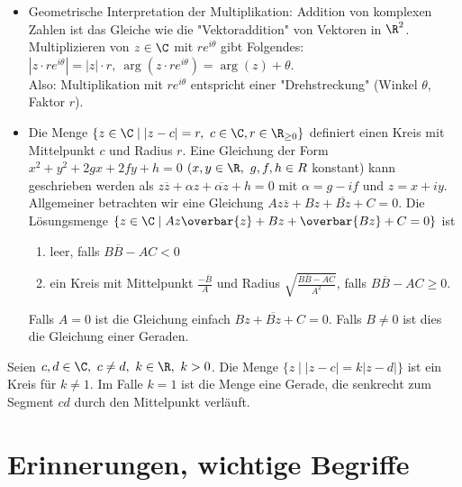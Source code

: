\begin{itemize}
	\item Geometrische Interpretation der Multiplikation: Addition von komplexen Zahlen ist das Gleiche wie die "Vektoraddition" von Vektoren in $\R^2$. Multiplizieren von $ z \in \C $ mit $ re^{i\theta} $ gibt Folgendes: $ |z \cdot re^{i\theta}| = |z| \cdot r,\ \arg(z \cdot re^{i\theta}) = \arg(z) + \theta $.\\
	Also: Multiplikation mit $ re^{i\theta} $ entspricht einer "Drehstreckung" (Winkel $\theta$, Faktor $r$).
	
	\item Die Menge $ \{z \in \C \mid |z-c| = r,\ c \in \C, r \in \R_{\geq 0}\} $ definiert einen Kreis mit Mittelpunkt $c$ und Radius $r$. Eine Gleichung der Form $ x^2 + y^2 + 2gx + 2fy + h = 0 $ $ (x,y \in \R,\ g,f,h \in R $ konstant) kann geschrieben werden als $ z \overbar{z} + \alpha z + \overbar{\alpha z} + h=0 $ mit $ \alpha = g-if $ und $ z = x+iy $. Allgemeiner betrachten wir eine Gleichung $ Az\overbar{z} + Bz + \overbar{Bz} + C = 0. $ Die Lösungsmenge $ \{ z \in \C \mid Az\overbar{z} + Bz + \overbar{Bz} + C = 0 \} $ ist
	\begin{enumerate}[label={\roman*})]
		\item leer, falls $ B\overbar{B} - AC < 0 $
		\item ein Kreis mit Mittelpunkt $ \frac{-\overbar{B}}{A} $ und Radius $ \sqrt{\frac{B \overbar{B} - AC}{A^2}} $, falls $ B\overbar{B} - AC \geq 0 $.
	\end{enumerate}
	Falls $A=0$ ist die Gleichung einfach $ Bz + \overbar{Bz} + C = 0 $. Falls $ B \neq 0 $ ist dies die Gleichung einer Geraden.
\end{itemize}

\begin{thm}
	Seien $ c,d \in \C,\ c \neq d,\ k \in \R,\ k > 0 $. Die Menge $ \{ z \mid |z-c| = k|z-d| \} $ ist ein Kreis für $ k \neq 1 $. Im Falle $ k = 1 $ ist die Menge eine Gerade, die senkrecht zum Segment $ cd $ durch den Mittelpunkt verläuft.
\end{thm}


\section{Erinnerungen, wichtige Begriffe}

